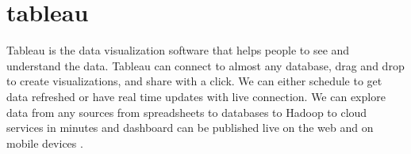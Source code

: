 \section{tableau}
Tableau is the data visualization software that helps people to see and understand the data. Tableau can connect to almost any database, drag and drop to create visualizations, and share with a click. We can either schedule to get data refreshed or have real time updates with live connection.  We can explore data from any sources from spreadsheets to databases to Hadoop to cloud services in minutes and  dashboard can be published live on the web and on mobile devices \cite{tableau}.
